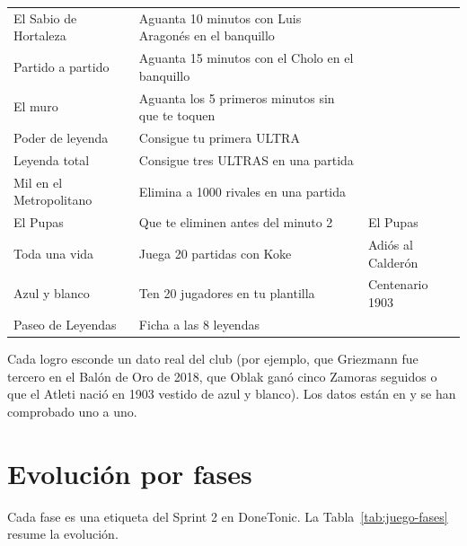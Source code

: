 \begin{longtable}{@{}L{2.2cm} L{4.5cm} L{2.8cm}@{}}
El Sabio de Hortaleza & Aguanta 10 minutos con Luis Aragonés en el banquillo &  \\
Partido a partido & Aguanta 15 minutos con el Cholo en el banquillo &  \\
El muro & Aguanta los 5 primeros minutos sin que te toquen &  \\
Poder de leyenda & Consigue tu primera ULTRA &  \\
Leyenda total & Consigue tres ULTRAS en una partida &  \\
Mil en el Metropolitano & Elimina a 1000 rivales en una partida &  \\
El Pupas & Que te eliminen antes del minuto 2 & El Pupas \\
Toda una vida & Juega 20 partidas con Koke & Adiós al Calderón \\
Azul y blanco & Ten 20 jugadores en tu plantilla & Centenario 1903 \\
Paseo de Leyendas & Ficha a las 8 leyendas &  \\*
\bottomrule
\end{longtable}

Cada logro esconde un dato real del club (por ejemplo, que Griezmann fue tercero en el Balón de Oro de 2018, que Oblak ganó cinco Zamoras seguidos o que el Atleti nació en 1903 vestido de azul y blanco). Los datos están en  y se han comprobado uno a uno.

\section{Evolución por fases}
\label{sec:juego-evolucion}

Cada fase es una etiqueta del Sprint 2 en DoneTonic. La Tabla~\ref{tab:juego-fases} resume la evolución.

